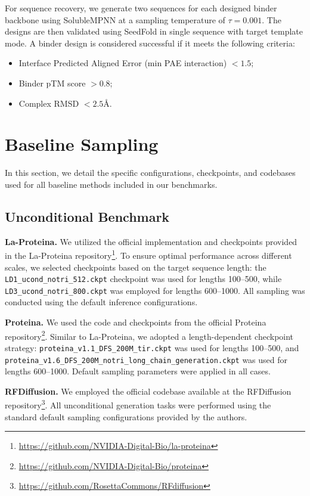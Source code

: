 For sequence recovery, we generate two sequences for each designed binder backbone using SolubleMPNN at a sampling temperature of $\tau = 0.001$. The designs are then validated using SeedFold in single sequence with target template mode. A binder design is considered successful if it meets the following criteria:
\begin{itemize}
    \item Interface Predicted Aligned Error (min PAE interaction) $< 1.5$;
    \item Binder pTM score $> 0.8$;
    \item Complex RMSD $< 2.5$\AA.
\end{itemize}




\section{Baseline Sampling}
\label{app:baseline_sampling}

In this section, we detail the specific configurations, checkpoints, and codebases used for all baseline methods included in our benchmarks.

\subsection{Unconditional Benchmark}

\textbf{La-Proteina.} We utilized the official implementation and checkpoints provided in the La-Proteina repository\footnote{\url{https://github.com/NVIDIA-Digital-Bio/la-proteina}}. To ensure optimal performance across different scales, we selected checkpoints based on the target sequence length: the \texttt{LD1\_ucond\_notri\_512.ckpt} checkpoint was used for lengths 100--500, while \texttt{LD3\_ucond\_notri\_800.ckpt} was employed for lengths 600--1000. All sampling was conducted using the default inference configurations.

\textbf{Proteina.} We used the code and checkpoints from the official Proteina repository\footnote{\url{https://github.com/NVIDIA-Digital-Bio/proteina}}. Similar to La-Proteina, we adopted a length-dependent checkpoint strategy: \texttt{proteina\_v1.1\_DFS\_200M\_tir.ckpt} was used for lengths 100--500, and \texttt{proteina\_v1.6\_DFS\_200M\_notri\_long\_chain\_generation.ckpt} was used for lengths 600--1000. Default sampling parameters were applied in all cases.

\textbf{RFDiffusion.} We employed the official codebase available at the RFDiffusion repository\footnote{\url{https://github.com/RosettaCommons/RFdiffusion}}. All unconditional generation tasks were performed using the standard default sampling configurations provided by the authors.

